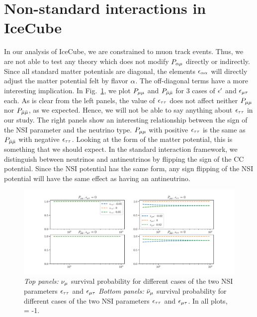 \documentclass[draft=True]{thesis}
\begin{document}
\section{Non-standard interactions in IceCube}
In our analysis of IceCube, we are constrained to muon track events. Thus, we are not able to test any theory which does not modify $P_{\alpha \mu}$ directly or 
indirectly. Since all standard matter potentials are diagonal, the elements $\epsilon_{\alpha\alpha}$ will directly adjust the matter potential felt 
by flavor $\alpha$. The off-diagonal terms have a more interesting implication. %
In Fig.~\ref{fig:IC_NSI_probs}, we plot $P_{\mu\mu}$ and $P_{\bar{\mu} \bar{\mu}}$ for 3 cases of $\epsilon^\prime$ and $\epsilon_{\mu\tau}$ each. As is clear from the 
left panels, the value of $\epsilon_{\tau\tau}$ does not affect neither $P_{\mu\mu}$ nor $P_{\bar{\mu} \bar{\mu}}$, as we expected. Hence, we will not be able
to say anything about $\epsilon_{\tau\tau}$ in our study. The right panels show an interesting relationship between the sign of the NSI parameter 
and the neutrino type. $P_{\mu\mu}$ with positive $\epsilon_{\tau\tau}$ is the same as $P_{\bar{\mu} \bar{\mu}}$ with negative $\epsilon_{\tau\tau}$. Looking at the form of the matter potential, 
this is something that we should expect. In the standard interaction framework, we distinguish between neutrinos and antineutrinos by flipping the sign 
of the CC potential. Since the NSI potential has the same form, any sign flipping of the NSI potential will have the same effect as 
having an antineutrino.

\begin{figure}\label{fig:IC_NSI_probs}
    \begin{center}
    \includegraphics[width=1\textwidth, height=0.3\textheight]{figures/IC_NSI_probs.pdf}
    \caption{\emph{Top panels: }$\nu_\mu$ survival probability for different cases of the two NSI parameters $\epsilon_{\tau\tau}$ and $\epsilon_{\mu\tau}$
    \emph{Bottom panels: }$\bar\nu_\mu$ survival probability for different cases of the two NSI parameters $\epsilon_{\tau\tau}$ and $\epsilon_{\mu\tau}$.
    In all plots, \ztrue = -1.}
    \end{center}
\end{figure}
\end{document}
